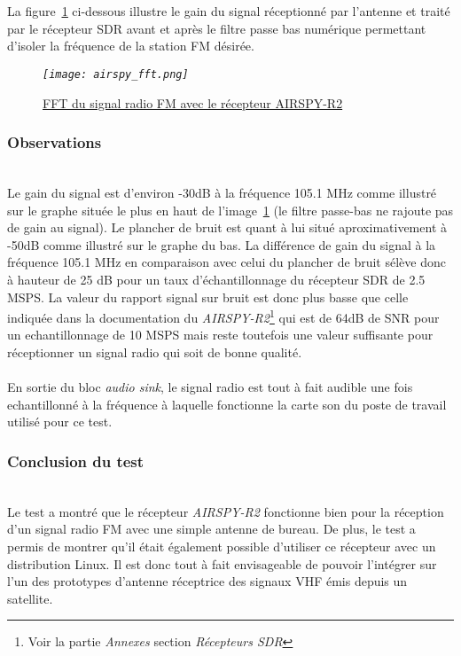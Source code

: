 \documentclass[12pt,fleqn]{book} %
\begin{document}
~\\\\La figure~\underline{\color{blue}\ref{airspy_fft}} ci-dessous illustre le gain du signal réceptionné par l'antenne et traité par le récepteur SDR avant et après le filtre passe bas numérique permettant d'isoler la fréquence de la station FM désirée.
\begin{figure}[H]
	\centering
	\itshape
	\texttt{[image: airspy\_fft.png]}
	\caption{\label{airspy_fft} \underline{FFT du signal radio FM avec le récepteur AIRSPY-R2}}
\end{figure}
\subsubsection{Observations}
~\\Le gain du signal est d'environ -30dB à la fréquence 105.1 MHz comme illustré sur le graphe située le plus en haut de l'image~\underline{\color{blue}\ref{airspy_fft}} (le filtre passe-bas ne rajoute pas de gain au signal). Le plancher de bruit est quant à lui situé aproximativement à -50dB comme illustré sur le graphe du bas. La différence de gain du signal à la fréquence 105.1 MHz en comparaison avec celui du plancher de bruit sélève donc à hauteur de 25 dB pour un taux d'échantillonnage du récepteur SDR de 2.5 MSPS.
La valeur du rapport signal sur bruit est donc plus basse que celle indiquée dans la documentation du \emph{AIRSPY-R2}\footnote{Voir la partie \emph{Annexes} section \emph{Récepteurs SDR}} qui est de 64dB de SNR pour un echantillonnage de 10 MSPS mais reste toutefois une valeur suffisante pour réceptionner un signal radio qui soit de bonne qualité.
~\\\\En sortie du bloc \emph{audio sink}, le signal radio est tout à fait audible une fois echantillonné à la fréquence à laquelle fonctionne la carte son du poste de travail utilisé pour ce test.
\subsubsection{Conclusion du test}
~\\Le test a montré que le récepteur \emph{AIRSPY-R2} fonctionne bien pour la réception d'un signal radio FM avec une simple antenne de bureau. De plus, le test a permis de montrer qu'il était également possible d'utiliser ce récepteur avec un distribution Linux.
Il est donc tout à fait envisageable de pouvoir l'intégrer sur l'un des prototypes d'antenne réceptrice des signaux VHF émis depuis un satellite.
\end{document}
